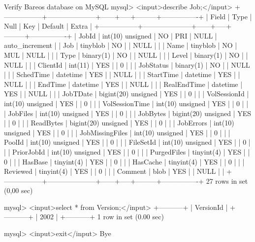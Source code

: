 \begin{commands}{Verify Bareos database on MySQL}
mysql> <input>describe Job;</input>
+-----------------+---------------------+------+-----+---------+----------------+
| Field           | Type                | Null | Key | Default | Extra          |
+-----------------+---------------------+------+-----+---------+----------------+
| JobId           | int(10) unsigned    | NO   | PRI | NULL    | auto_increment |
| Job             | tinyblob            | NO   |     | NULL    |                |
| Name            | tinyblob            | NO   | MUL | NULL    |                |
| Type            | binary(1)           | NO   |     | NULL    |                |
| Level           | binary(1)           | NO   |     | NULL    |                |
| ClientId        | int(11)             | YES  |     | 0       |                |
| JobStatus       | binary(1)           | NO   |     | NULL    |                |
| SchedTime       | datetime            | YES  |     | NULL    |                |
| StartTime       | datetime            | YES  |     | NULL    |                |
| EndTime         | datetime            | YES  |     | NULL    |                |
| RealEndTime     | datetime            | YES  |     | NULL    |                |
| JobTDate        | bigint(20) unsigned | YES  |     | 0       |                |
| VolSessionId    | int(10) unsigned    | YES  |     | 0       |                |
| VolSessionTime  | int(10) unsigned    | YES  |     | 0       |                |
| JobFiles        | int(10) unsigned    | YES  |     | 0       |                |
| JobBytes        | bigint(20) unsigned | YES  |     | 0       |                |
| ReadBytes       | bigint(20) unsigned | YES  |     | 0       |                |
| JobErrors       | int(10) unsigned    | YES  |     | 0       |                |
| JobMissingFiles | int(10) unsigned    | YES  |     | 0       |                |
| PoolId          | int(10) unsigned    | YES  |     | 0       |                |
| FileSetId       | int(10) unsigned    | YES  |     | 0       |                |
| PriorJobId      | int(10) unsigned    | YES  |     | 0       |                |
| PurgedFiles     | tinyint(4)          | YES  |     | 0       |                |
| HasBase         | tinyint(4)          | YES  |     | 0       |                |
| HasCache        | tinyint(4)          | YES  |     | 0       |                |
| Reviewed        | tinyint(4)          | YES  |     | 0       |                |
| Comment         | blob                | YES  |     | NULL    |                |
+-----------------+---------------------+------+-----+---------+----------------+
27 rows in set (0,00 sec)

mysql> <input>select * from Version;</input>
+-----------+
| VersionId |
+-----------+
|      2002 |
+-----------+
1 row in set (0.00 sec)

mysql> <input>exit</input>
Bye
\end{commands}


